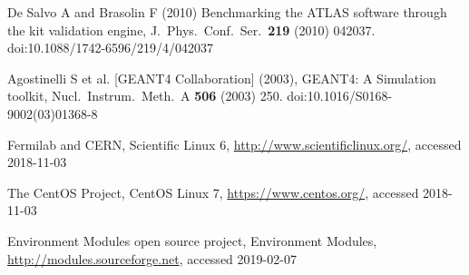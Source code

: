 \begin{thebibliography}{}
De Salvo A and Brasolin F (2010)
Benchmarking the ATLAS software through the kit validation engine,
J.\ Phys.\ Conf.\ Ser.\  {\bf 219} (2010) 042037.
doi:10.1088/1742-6596/219/4/042037


Agostinelli S  et al. [GEANT4 Collaboration] (2003),        
GEANT4: A Simulation toolkit,                          
Nucl.\ Instrum.\ Meth.\ A {\bf 506} (2003) 250.            
doi:10.1016/S0168-9002(03)01368-8                          


Fermilab and CERN,
Scientific Linux 6,
\url{http://www.scientificlinux.org/}, accessed 2018-11-03

The CentOS Project,
CentOS Linux 7,
\url{https://www.centos.org/}, accessed 2018-11-03

Environment Modules open source project,
Environment Modules,
\url{http://modules.sourceforge.net}, accessed 2019-02-07

\end{thebibliography}



